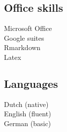 \begin{minipage}[t]{0.4\textwidth} %


\subsection*{Office skills}
\vspace{-8pt}
Microsoft Office\\
Google suites\\
Rmarkdown\\
Latex\\
\vspace{-8pt}

\subsection*{Languages}
\vspace{-8pt}
Dutch (native)\\
English (fluent)\\
German (basic)\\
\end{minipage} %


\newpage



